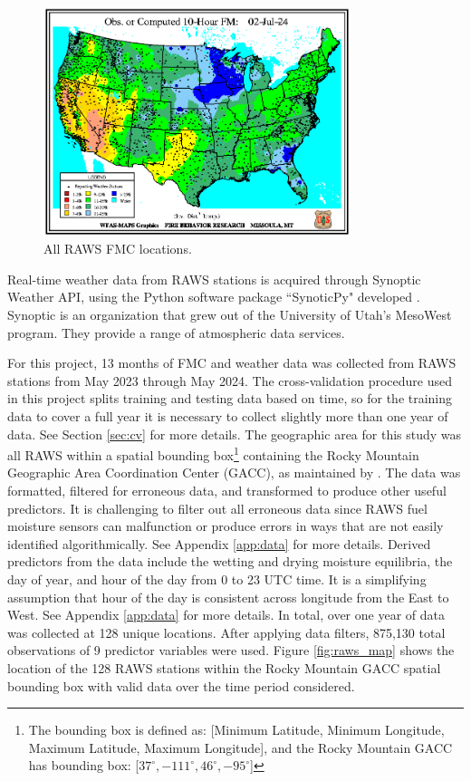 \documentclass[11pt]{article}%
\begin{document}
\begin{figure}[ht]
    \centering
    \includegraphics[width=0.8\textwidth]{images/WFAS-RAWS-map.png}
    \caption{All RAWS FMC locations.}
    \label{fig:wfas_raws}
\end{figure}

Real-time weather data from RAWS stations is acquired through Synoptic Weather API, using the Python software package ``SynoticPy" developed \citep{Synoptic-2024-SWA, Blaylock-2023-SPA}. Synoptic is an organization that grew out of the University of Utah's MesoWest program. They provide a range of atmospheric data services.

For this project, 13 months of FMC and weather data was collected from RAWS stations from May 2023 through May 2024. The cross-validation procedure used in this project splits training and testing data based on time, so for the training data to cover a full year it is necessary to collect slightly more than one year of data. See Section \ref{sec:cv} for more details. The geographic area for this study was all RAWS within a spatial bounding box\footnote{
The bounding box is defined as: [Minimum Latitude, Minimum Longitude, Maximum Latitude, Maximum Longitude], and the Rocky Mountain GACC has bounding box: [$37^\circ, -111^\circ, 46^\circ, -95^\circ$]} containing the Rocky Mountain Geographic Area Coordination Center (GACC), as maintained by \cite{NIFC-2024-GAC}. The data was formatted,  filtered for erroneous data, and transformed to produce other useful predictors. It is challenging to filter out all erroneous data since RAWS fuel moisture sensors can malfunction or produce errors in ways that are not easily identified algorithmically. See Appendix \ref{app:data} for more details. Derived predictors from the data include the wetting and drying moisture equilibria, the day of year, and hour of the day from 0 to 23 UTC time. It is a simplifying assumption that hour of the day is consistent across longitude from the East to West. See Appendix \ref{app:data} for more details. In total, over one year of data was collected at 128 unique locations. After applying data filters, 875,130 total observations of 9 predictor variables were used. Figure \ref{fig:raws_map} shows the location of the 128 RAWS stations within the Rocky Mountain GACC spatial bounding box with valid data over the time period considered.
\end{document}
